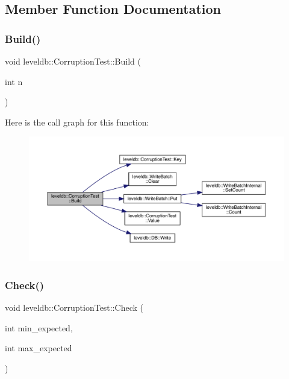 \subsection{Member Function Documentation}
\mbox{\label{classleveldb_1_1_corruption_test_a54d2114311c61356e879b5ccfc3cda18}} 
\subsubsection{\texorpdfstring{Build()}{Build()}}
{\footnotesize\ttfamily void leveldb\+::\+Corruption\+Test\+::\+Build (\begin{DoxyParamCaption}\item[{int}]{n }\end{DoxyParamCaption})\hspace{0.3cm}{\ttfamily [inline]}}

Here is the call graph for this function\+:
\nopagebreak
\begin{figure}[H]
\begin{center}
\leavevmode
\includegraphics[width=350pt]{classleveldb_1_1_corruption_test_a54d2114311c61356e879b5ccfc3cda18_cgraph}
\end{center}
\end{figure}
\mbox{\label{classleveldb_1_1_corruption_test_aa03dcde1d0771ebbcf7d6ac8bda9c725}} 
\subsubsection{\texorpdfstring{Check()}{Check()}}
{\footnotesize\ttfamily void leveldb\+::\+Corruption\+Test\+::\+Check (\begin{DoxyParamCaption}\item[{int}]{min\+\_\+expected,  }\item[{int}]{max\+\_\+expected }\end{DoxyParamCaption})\hspace{0.3cm}{\ttfamily [inline]}}

